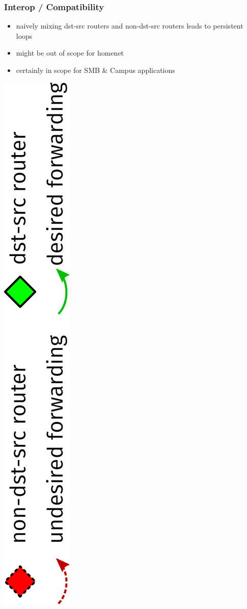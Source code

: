 \documentclass[12pt]{beamer}
\begin{document}
\begin{frame}
  \frametitle{Interop / Compatibility}
  \begin{itemize}
    \item naively mixing dst-src routers and non-dst-src routers leads to persistent loops
    \item might be out of scope for homenet
    \item certainly in scope for SMB \& Campus applications
  \end{itemize}
  \vspace{10mm}
  \includegraphics[scale=0.45,angle=-90]{isis_loop_legend.pdf}%
\end{frame}
\end{document}
